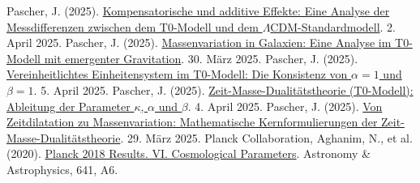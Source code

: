 \documentclass[a4paper,12pt]{article}
\begin{document}
	\begin{thebibliography}{99}
		 Pascher, J. (2025). \href{https://github.com/jpascher/T0-Time-Mass-Duality/tree/main/2/pdf/Deutsch/MessdifferenzenT0Standard.pdf}{Kompensatorische und additive Effekte: Eine Analyse der Messdifferenzen zwischen dem T0-Modell und dem \(\Lambda\)CDM-Standardmodell}. 2. April 2025.
		 Pascher, J. (2025). \href{https://github.com/jpascher/T0-Time-Mass-Duality/tree/main/2/pdf/Deutsch/MassVarGalaxien.pdf}{Massenvariation in Galaxien: Eine Analyse im T0-Modell mit emergenter Gravitation}. 30. März 2025.
		 Pascher, J. (2025). \href{https://github.com/jpascher/T0-Time-Mass-Duality/tree/main/2/pdf/Deutsch/Alpha1Beta1Konsistenz.pdf}{Vereinheitlichtes Einheitensystem im T0-Modell: Die Konsistenz von \(\alpha = 1\) und \(\beta = 1\)}. 5. April 2025.
		 Pascher, J. (2025). \href{https://github.com/jpascher/T0-Time-Mass-Duality/tree/main/2/pdf/Deutsch/ZeitMasseT0Params.pdf}{Zeit-Masse-Dualitätstheorie (T0-Modell): Ableitung der Parameter \(\kappa\), \(\alpha\) und \(\beta\)}. 4. April 2025.
		 Pascher, J. (2025). \href{https://github.com/jpascher/T0-Time-Mass-Duality/tree/main/2/pdf/Deutsch/MathZeitMasseLagrange.pdf}{Von Zeitdilatation zu Massenvariation: Mathematische Kernformulierungen der Zeit-Masse-Dualitätstheorie}. 29. März 2025.
		 Planck Collaboration, Aghanim, N., et al. (2020). \href{https://doi.org/10.1051/0004-6361/201833910}{Planck 2018 Results. VI. Cosmological Parameters}. Astronomy \& Astrophysics, 641, A6.
	\end{thebibliography}
	
\end{document}
